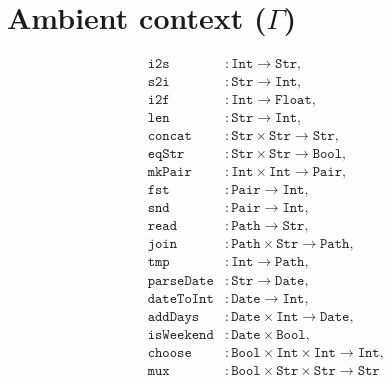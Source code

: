 \documentclass[sigplan,nonacm]{acmart}\settopmatter{printfolios=false,printccs=false,printacmref=false}
\begin{document}
  \section{Ambient context ($\Gamma$)}\label{sec:ac}
  \begin{align*}
  \phantom{....}\texttt{i2s} & :       \texttt{Int} \rightarrow \texttt{Str},\\
  \phantom{....}\texttt{s2i} & :       \texttt{Str} \rightarrow \texttt{Int},\\
  \phantom{....}\texttt{i2f} & :       \texttt{Int} \rightarrow \texttt{Float},\\
  \phantom{....}\texttt{len} & :       \texttt{Str} \rightarrow \texttt{Int},\\
  \phantom{....}\texttt{concat} & :    \texttt{Str} \times \texttt{Str} \rightarrow \texttt{Str},\\
  \phantom{....}\texttt{eqStr} & :     \texttt{Str} \times \texttt{Str} \rightarrow \texttt{Bool},\\
  \phantom{....}\texttt{mkPair} & :    \texttt{Int} \times \texttt{Int} \rightarrow \texttt{Pair},\\
  \phantom{....}\texttt{fst} & :       \texttt{Pair} \rightarrow \texttt{Int},\\
  \phantom{....}\texttt{snd} & :       \texttt{Pair} \rightarrow \texttt{Int},\\
  \phantom{....}\texttt{read} & :      \texttt{Path} \rightarrow \texttt{Str},\\
  \phantom{....}\texttt{join} & :      \texttt{Path} \times \texttt{Str} \rightarrow \texttt{Path},\\
  \phantom{....}\texttt{tmp} & :       \texttt{Int} \rightarrow \texttt{Path},\\
  \phantom{....}\texttt{parseDate} & : \texttt{Str} \rightarrow \texttt{Date},\\
  \phantom{....}\texttt{dateToInt} & : \texttt{Date} \rightarrow \texttt{Int},\\
  \phantom{....}\texttt{addDays} & :   \texttt{Date} \times \texttt{Int} \rightarrow \texttt{Date},\\
  \phantom{....}\texttt{isWeekend} & : \texttt{Date} \times \texttt{Bool},\\
  \phantom{....}\texttt{choose} & :    \texttt{Bool} \times \texttt{Int} \times \texttt{Int} \rightarrow \texttt{Int},\\
  \phantom{....}\texttt{mux} & :       \texttt{Bool} \times \texttt{Str} \times \texttt{Str} \rightarrow \texttt{Str}\\
  \end{align*}
\end{document}

